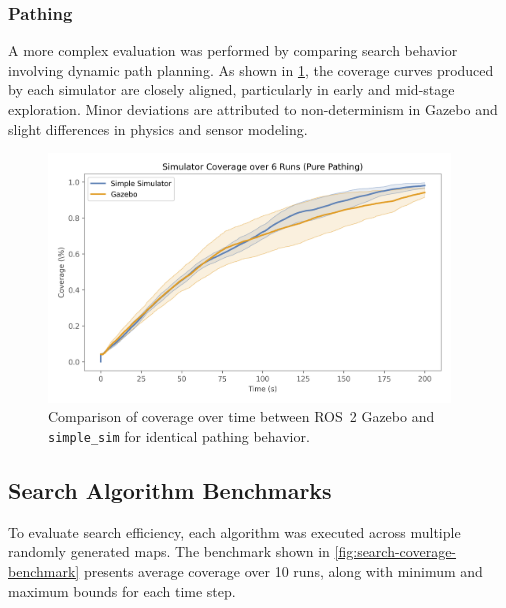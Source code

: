 \subsubsection{Pathing}
A more complex evaluation was performed by comparing search behavior involving dynamic path planning. As shown in \cref{fig:coverage-benchmark}, the coverage curves produced by each simulator are closely aligned, particularly in early and mid-stage exploration. Minor deviations are attributed to non-determinism in Gazebo and slight differences in physics and sensor modeling.

\begin{figure}[H]
    \begin{center}
        \includegraphics[width=0.95\textwidth]{./figures/plots/gazebo_vs_simple_sim_pure_pathing.png}
    \end{center}
    \caption{Comparison of coverage over time between ROS~2 Gazebo and \texttt{simple\_sim} for identical pathing behavior.}
    \label{fig:coverage-benchmark}
\end{figure}

\subsection{Search Algorithm Benchmarks}
To evaluate search efficiency, each algorithm was executed across multiple randomly generated maps. The benchmark shown in \cref{fig:search-coverage-benchmark} presents average coverage over 10 runs, along with minimum and maximum bounds for each time step.

